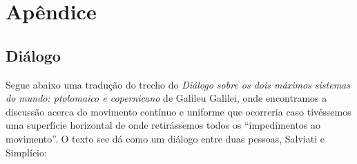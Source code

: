 
\section{Apêndice}

\subsection{Diálogo}
\label{Sec:TextoDialogo}

Segue abaixo uma tradução do trecho do \emph{Diálogo sobre os dois máximos sistemas do mundo: ptolomaico e copernicano} de Galileu Galilei, onde encontramos a discussão acerca do movimento contínuo e uniforme que ocorreria caso tivéssemos uma superfície horizontal de onde retirássemos todos os ``impedimentos ao movimento''. O texto see dá como um diálogo entre duas pessoas, Salviati e  Simplício:
